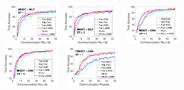 \documentclass[nohyperref]{article}
\theoremstyle{plain}
\theoremstyle{definition}
\theoremstyle{remark}
\begin{document}
\begin{figure}[t]

\vspace{-0.1in}

    \begin{center}
        \mbox{
        \hspace{-0.1in}\includegraphics[width=0.26\textwidth]{figure_mime/mnist_testerror_mlp_ep1_iid0_mime.pdf}
        \hspace{-0.1in}\includegraphics[width=0.26\textwidth]{figure_mime/mnist_testerror_mlp_ep3_iid0_mime.pdf}
                }
        \mbox{
        \hspace{-0.1in}\includegraphics[width=0.26\textwidth]{figure_mime/mnist_testerror_cnn_ep1_iid0_mime.pdf}
        \hspace{-0.1in}\includegraphics[width=0.26\textwidth]{figure_mime/mnist_testerror_cnn_ep3_iid0_mime.pdf}
                }
        \mbox{
        \hspace{-0.1in}\includegraphics[width=0.26\textwidth]{figure_mime/fmnist_testerror_cnn_ep1_iid0_mime.pdf}
}
\end{center}
\end{figure}
\end{document}
